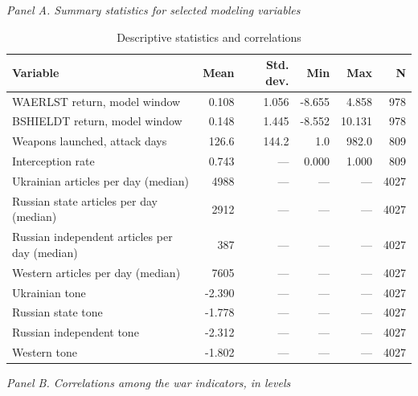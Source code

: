 \documentclass[12pt,a4paper]{article}
\begin{document}
\begin{table}[H]
\centering
\caption{Descriptive statistics and correlations}
\label{tab:summary_statistics}
\begin{threeparttable}

\footnotesize
\textit{Panel A. Summary statistics for selected modeling variables}

\begin{tabular}{lrrrrr}
\toprule
Variable & Mean & Std. dev. & Min & Max & N \\
\midrule
WAERLST return, model window & 0.108 & 1.056 & -8.655 & 4.858 & 978 \\
BSHIELDT return, model window & 0.148 & 1.445 & -8.552 & 10.131 & 978 \\
Weapons launched, attack days & 126.6 & 144.2 & 1.0 & 982.0 & 809 \\
Interception rate & 0.743 & --- & 0.000 & 1.000 & 809 \\
Ukrainian articles per day (median) & 4988 & --- & --- & --- & 4027 \\
Russian state articles per day (median) & 2912 & --- & --- & --- & 4027 \\
Russian independent articles per day (median) & 387 & --- & --- & --- & 4027 \\
Western articles per day (median) & 7605 & --- & --- & --- & 4027 \\
Ukrainian tone & -2.390 & --- & --- & --- & 4027 \\
Russian state tone & -1.778 & --- & --- & --- & 4027 \\
Russian independent tone & -2.312 & --- & --- & --- & 4027 \\
Western tone & -1.802 & --- & --- & --- & 4027 \\
\bottomrule
\end{tabular}

\vspace{1em}
\textit{Panel B. Correlations among the war indicators, in levels}


\end{threeparttable}
\end{table}
\end{document}
